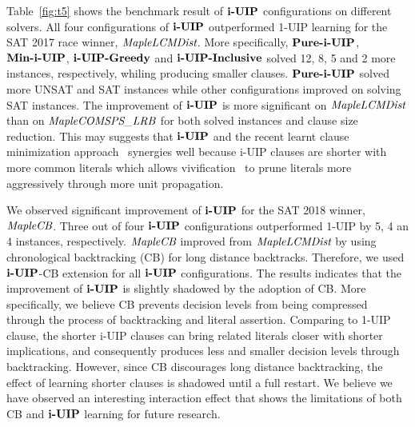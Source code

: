 

Table~\ref{fig:t5} shows the benchmark result of $\textbf{i-UIP}$ configurations on different solvers. All four configurations of $\textbf{i-UIP}$ outperformed 1-UIP learning for the SAT 2017 race winner, $\textit{MapleLCMDist}$. More specifically, $\textbf{Pure-i-UIP}$, $\textbf{Min-i-UIP}$, $\textbf{i-UIP-Greedy}$ and $\textbf{i-UIP-Inclusive}$ solved 12, 8, 5 and 2 more instances, respectively, whiling producing smaller clauses. $\textbf{Pure-i-UIP}$ solved more UNSAT and SAT instances while other configurations improved on solving SAT instances.  The improvement of $\textbf{i-UIP}$ is more significant on $\textit{MapleLCMDist}$ than on $\textit{MapleCOMSPS\_LRB}$ for both solved instances and clause size reduction. This may suggests that $\textbf{i-UIP}$ and the recent learnt clause minimization approach~\cite{} synergies well because i-UIP clauses are shorter with more common literals which allows vivification~\cite{} to prune literals more aggressively through more unit propagation. 

We observed significant improvement of $\textbf{i-UIP}$ for the SAT 2018 winner, $\textit{MapleCB}$. Three out of four $\textbf{i-UIP}$ configurations outperformed 1-UIP by 5, 4 an 4 instances, respectively. $\textit{MapleCB}$ improved from $\textit{MapleLCMDist}$ by using chronological backtracking (CB) for long distance backtracks. Therefore, we used $\textbf{i-UIP}$-CB extension for all $\textbf{i-UIP}$ configurations. The results indicates that the improvement of $\textbf{i-UIP}$ is slightly shadowed by the adoption of CB. More specifically, we believe CB prevents decision levels from being compressed through the process of backtracking and literal assertion. Comparing to 1-UIP clause, the shorter i-UIP clauses can bring related literals closer with shorter implications, and consequently produces less and smaller decision levels through  backtracking. However, since CB discourages long distance backtracking, the effect of learning shorter clauses is shadowed until a full restart.  We believe we have observed an interesting interaction effect that shows the limitations of both CB and $\textbf{i-UIP}$ learning for future research.  

